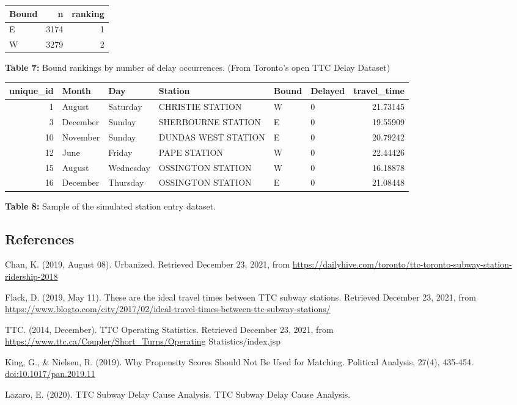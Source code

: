 \documentclass[
]{article}
\begin{document}
\begin{table}[H]
\centering
\begin{tabular}{l|r|r}
\hline
Bound & n & ranking\\
\hline
E & 3174 & 1\\
\hline
W & 3279 & 2\\
\hline
\end{tabular}
\end{table}

\textbf{Table 7:} Bound rankings by number of delay occurrences. (From
Toronto's open TTC Delay Dataset)

\begin{table}[H]
\centering
\begin{tabular}{r|l|l|l|l|l|r}
\hline
unique\_id & Month & Day & Station & Bound & Delayed & travel\_time\\
\hline
1 & August & Saturday & CHRISTIE STATION & W & 0 & 21.73145\\
\hline
3 & December & Sunday & SHERBOURNE STATION & E & 0 & 19.55909\\
\hline
10 & November & Sunday & DUNDAS WEST STATION & E & 0 & 20.79242\\
\hline
12 & June & Friday & PAPE STATION & W & 0 & 22.44426\\
\hline
15 & August & Wednesday & OSSINGTON STATION & W & 0 & 16.18878\\
\hline
16 & December & Thursday & OSSINGTON STATION & E & 0 & 21.08448\\
\hline
\end{tabular}
\end{table}

\textbf{Table 8:} Sample of the simulated station entry dataset.

\hypertarget{references}{%
\subsection{References}\label{references}}

Chan, K. (2019, August 08). Urbanized. Retrieved December 23, 2021, from
\url{https://dailyhive.com/toronto/ttc-toronto-subway-station-ridership-2018}

Flack, D. (2019, May 11). These are the ideal travel times between TTC
subway stations. Retrieved December 23, 2021, from
\url{https://www.blogto.com/city/2017/02/ideal-travel-times-between-ttc-subway-stations/}

TTC. (2014, December). TTC Operating Statistics. Retrieved December 23,
2021, from \url{https://www.ttc.ca/Coupler/Short_Turns/Operating}
Statistics/index.jsp

King, G., \& Nielsen, R. (2019). Why Propensity Scores Should Not Be
Used for Matching. Political Analysis, 27(4), 435-454.
\url{doi:10.1017/pan.2019.11}

Lazaro, E. (2020). TTC Subway Delay Cause Analysis. TTC Subway Delay
Cause Analysis.
\end{document}
